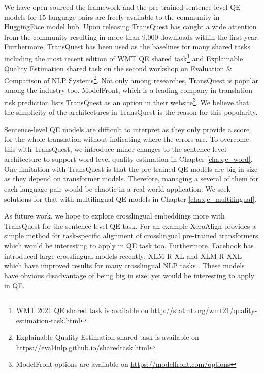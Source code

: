 We have open-sourced the framework and the pre-trained sentence-level QE models for 15 language pairs are freely available to the community in HuggingFace model hub. Upon releasing TransQuest has caught a wide attention from the community resulting in more than 9,000 downloads within the first year. Furthermore, TransQuest has been used as the baselines for many shared tasks including the most recent edition of WMT QE shared task\footnote{WMT 2021 QE shared task is available on \url{http://statmt.org/wmt21/quality-estimation-task.html}} and Explainable Quality Estimation shared task on the second workshop on Evaluation \& Comparison of NLP Systems\footnote{Explainable Quality Estimation shared task is available on \url{https://eval4nlp.github.io/sharedtask.html}}. Not only among researches, TransQuest is popular among the industry too. ModelFront, which is a leading company in translation risk prediction lists TransQuest as an option in their website\footnote{ModelFront options are available on \url{https://modelfront.com/options}}. We believe that the simplicity of the architectures in TransQuest is the reason for this popularity. 

Sentence-level QE models are difficult to interpret as they only provide a score for the whole translation without indicating where the errors are. To overcome this with TransQuest, we introduce minor changes to the sentence-level architecture to support word-level quality estimation in Chapter \ref{cha:qe_word}. One limitation with TransQuest is that the pre-trained QE models are big in size as they depend on transformer models. Therefore, managing a several of them for each language pair would be chaotic in a real-world application. We seek solutions for that with multilingual QE models in Chapter \ref{cha:qe_multilingual}. 

As future work, we hope to explore crosslingual embeddings more with TransQuest for the sentence-level QE task. For an example XeroAlign \autocite{gritta-iacobacci-2021-xeroalign} provides a simple method for task-specific alignment of crosslingual pre-trained transformers which would be interesting to apply in QE task too. Furthermore, Facebook has introduced large crosslingual models recently; XLM-R XL and XLM-R XXL which have improved results for many crosslingual NLP tasks \autocite{goyal2021}. These models have obvious disadvantage of being big in size; yet would be interesting to apply in QE. 









